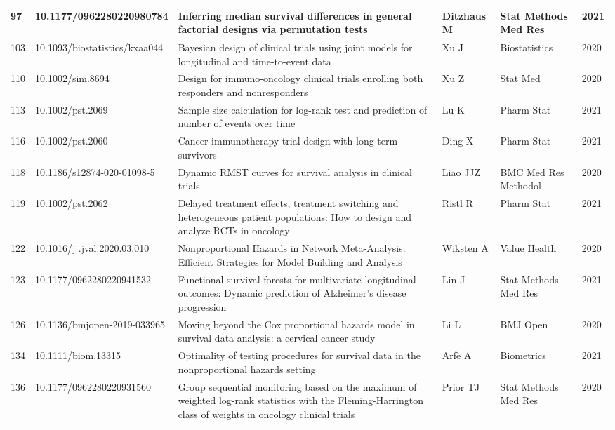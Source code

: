 \begin{landscape}
\begin{longtable}{|p{0.3in}|p{1.8in}|p{2.4in}|p{0.68in}|p{0.89in}|p{0.3in}|}
97 & 10.1177/0962280220980784     & Inferring median survival differences in general factorial designs via permutation tests & Ditzhaus M & Stat Methods Med Res & 2021 \\ \hline 
103 & 10.1093/biostatistics/kxaa044    & Bayesian design of clinical trials using joint models for longitudinal and time-to-event data & Xu J & Biostatistics & 2020 \\ \hline 
110 & 10.1002/sim.8694       & Design for immuno-oncology clinical trials enrolling both responders and nonresponders & Xu Z & Stat Med & 2020 \\ \hline 
113 & 10.1002/pst.2069     & Sample size calculation for log-rank test and prediction of number of events over time & Lu K & Pharm Stat & 2021 \\ \hline 
116 & 10.1002/pst.2060    & Cancer immunotherapy trial design with long-term survivors & Ding X & Pharm Stat & 2021 \\ \hline 
118 & 10.1186/s12874-020-01098-5       & Dynamic RMST curves for survival analysis in clinical trials & Liao JJZ & BMC Med Res Methodol & 2020 \\ \hline 
119 & 10.1002/pst.2062    & Delayed treatment effects, treatment switching and heterogeneous patient populations: How to design and analyze RCTs in oncology & Ristl R & Pharm Stat & 2021 \\ \hline 
122 & 10.1016/j  .jval.2020.03.010   & Nonproportional Hazards in Network Meta-Analysis: Efficient Strategies for Model Building and Analysis & Wiksten A & Value Health & 2020 \\ \hline 
123 & 10.1177/0962280220941532       & Functional survival forests for multivariate longitudinal outcomes: Dynamic prediction of Alzheimer's disease progression & Lin J & Stat Methods Med Res & 2021 \\ \hline 
126 & 10.1136/bmjopen-2019-033965      & Moving beyond the Cox proportional hazards model in survival data analysis: a cervical cancer study & Li L & BMJ Open & 2020 \\ \hline 
134 & 10.1111/biom.13315       & Optimality of testing procedures for survival data in the nonproportional hazards setting & Arf\`{e} A & Biometrics & 2021 \\ \hline 
136 & 10.1177/0962280220931560        & Group sequential monitoring based on the maximum of weighted log-rank statistics with the Fleming-Harrington class of weights in oncology clinical trials & Prior TJ & Stat Methods Med Res & 2020 \\ \hline 

\end{longtable}
\end{landscape}
